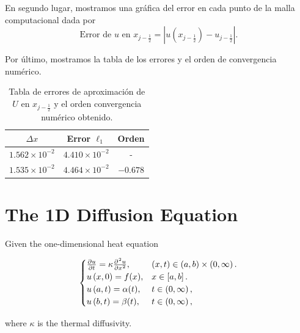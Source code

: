 En segundo lugar, mostramos una gráfica del error en cada punto de la malla computacional
dada por
\begin{equation*}
    \text{Error de $u$ en $x_{j-\frac{1}{2}}$}=
    \left|
    u\left(x_{j-\frac{1}{2}}\right)-
    u_{j-\frac{1}{2}}
    \right|.
\end{equation*}

Por último, mostramos la tabla de los errores y el orden de convergencia numérico.

\begin{table}[ht!]
    \centering
    \begin{tabular}{ccc}
        \toprule
        $\Delta x$            & Error $\ell_1$        & Orden    \\
        \midrule
        $1.562\times 10^{-2}$ & $4.410\times 10^{-2}$ & -        \\
        $1.535\times 10^{-2}$ & $4.464\times 10^{-2}$ & $-0.678$ \\
        \bottomrule
    \end{tabular}
    \caption{Tabla de errores de aproximación de $U$ en
        $x_{j-\frac{1}{2}}$ y el orden convergencia numérico obtenido.}
    \label{table:errors}
\end{table}


\section{The 1D Diffusion Equation}

Given the one-dimensional heat equation

\begin{equation}\label{eq:IBVPheat1d}
    \begin{cases}
        \diffp{u}{t}=
        \kappa\diffp[2]{u}{x},
                                      & \left(x,t\right)\in
        \left(a,b \right)\times\left(0, \infty \right).     \\
        u\left(x,0\right)=f(x),
                                      & x\in
        \left[a,b\right].                                   \\
        u\left(a,t\right)= \alpha(t), & t\in
        \left(0,\infty\right),                              \\
        u\left(b,t\right)= \beta(t),
                                      & t\in
        \left(0,\infty\right),
    \end{cases}
\end{equation}

where $\kappa$ is the thermal diffusivity.\\

